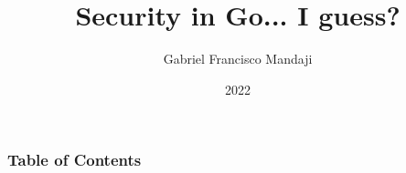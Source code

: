 \documentclass{beamer}
\title{Security in Go... I guess?}
\author{Gabriel Francisco Mandaji}
\date{2022}
\begin{document}
\begin{frame}
    \titlepage
\end{frame}

\begin{frame}
    \frametitle{Table of Contents}
    \tableofcontents[subsectionstyle=hide]
\end{frame}


\end{document}
